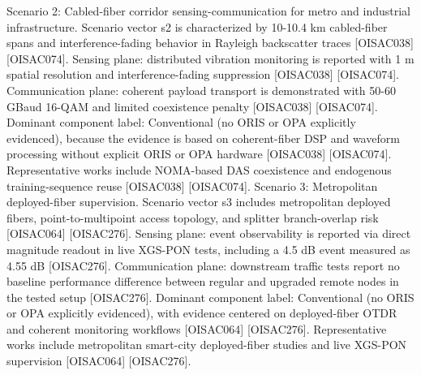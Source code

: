 {}Scenario 2: Cabled-fiber corridor sensing-communication for metro and industrial infrastructure.\markdownRendererHardLineBreak
{}Scenario vector s2 is characterized by 10-10.4 km cabled-fiber spans and interference-fading behavior in Rayleigh backscatter traces [O\markdownRendererUnderscore{}ISAC\markdownRendererUnderscore{}038] [O\markdownRendererUnderscore{}ISAC\markdownRendererUnderscore{}074]. Sensing plane: distributed vibration monitoring is reported with 1 m spatial resolution and interference-fading suppression [O\markdownRendererUnderscore{}ISAC\markdownRendererUnderscore{}038] [O\markdownRendererUnderscore{}ISAC\markdownRendererUnderscore{}074]. Communication plane: coherent payload transport is demonstrated with 50-60 GBaud 16-QAM and limited coexistence penalty [O\markdownRendererUnderscore{}ISAC\markdownRendererUnderscore{}038] [O\markdownRendererUnderscore{}ISAC\markdownRendererUnderscore{}074]. Dominant component label: Conventional (no ORIS or OPA explicitly evidenced), because the evidence is based on coherent-fiber DSP and waveform processing without explicit ORIS or OPA hardware [O\markdownRendererUnderscore{}ISAC\markdownRendererUnderscore{}038] [O\markdownRendererUnderscore{}ISAC\markdownRendererUnderscore{}074]. Representative works include NOMA-based DAS coexistence and endogenous training-sequence reuse [O\markdownRendererUnderscore{}ISAC\markdownRendererUnderscore{}038] [O\markdownRendererUnderscore{}ISAC\markdownRendererUnderscore{}074].\markdownRendererParagraphSeparator
{}Scenario 3: Metropolitan deployed-fiber supervision.\markdownRendererHardLineBreak
{}Scenario vector s3 includes metropolitan deployed fibers, point-to-multipoint access topology, and splitter branch-overlap risk [O\markdownRendererUnderscore{}ISAC\markdownRendererUnderscore{}064] [O\markdownRendererUnderscore{}ISAC\markdownRendererUnderscore{}276]. Sensing plane: event observability is reported via direct magnitude readout in live XGS-PON tests, including a 4.5 dB event measured as 4.55 dB [O\markdownRendererUnderscore{}ISAC\markdownRendererUnderscore{}276]. Communication plane: downstream traffic tests report no baseline performance difference between regular and upgraded remote nodes in the tested setup [O\markdownRendererUnderscore{}ISAC\markdownRendererUnderscore{}276]. Dominant component label: Conventional (no ORIS or OPA explicitly evidenced), with evidence centered on deployed-fiber OTDR and coherent monitoring workflows [O\markdownRendererUnderscore{}ISAC\markdownRendererUnderscore{}064] [O\markdownRendererUnderscore{}ISAC\markdownRendererUnderscore{}276]. Representative works include metropolitan smart-city deployed-fiber studies and live XGS-PON supervision [O\markdownRendererUnderscore{}ISAC\markdownRendererUnderscore{}064] [O\markdownRendererUnderscore{}ISAC\markdownRendererUnderscore{}276].\markdownRendererParagraphSeparator
